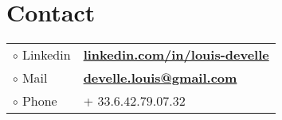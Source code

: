 \section{Contact}
	\begin{tabular} { l l }
	$ \circ $ Linkedin & \href{https://www.linkedin.com/in/louis-develle/}{\bf linkedin.com/in/louis-develle} \\
	$ \circ $ Mail & \href{mailto:develle.louis@gmail.com}{\bf develle.louis@gmail.com} \\
	$ \circ $ Phone & + $33.6.42.79.07.32$ \\
	\end{tabular}
\sectionspace %
